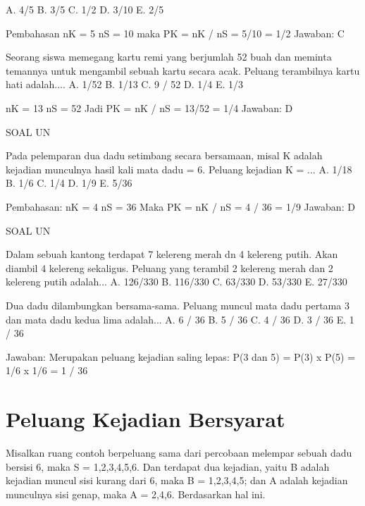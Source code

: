 \documentclass[11pt,fleqn]{book} %
\begin{document}
{{A. 4/5
B. 3/5
C. 1/2
D. 3/10
E. 2/5

\vspace{0.5in}


Pembahasan
nK = 5
nS = 10
maka PK = nK / nS = 5/10 = 1/2
Jawaban: C

\vspace{0.5in}

Seorang siswa memegang kartu remi yang berjumlah 52 buah dan meminta temannya untuk mengambil sebuah kartu secara acak. Peluang terambilnya kartu hati adalah....
A. 1/52
B. 1/13
C. 9 / 52
D. 1/4
E. 1/3

\vspace{0.5in}

nK = 13
nS = 52
Jadi PK = nK / nS = 13/52 = 1/4
Jawaban: D

\vspace{0.5in}
SOAL UN 

Pada pelemparan dua dadu setimbang secara bersamaan, misal K adalah kejadian munculnya hasil kali mata dadu = 6. Peluang kejadian K = ...
A. 1/18
B. 1/6
C. 1/4
D. 1/9
E. 5/36

\vspace{0.5in}

Pembahasan: 
nK = 4
nS = 36
Maka PK = nK / nS = 4 / 36 = 1/9
Jawaban: D

\vspace{0.5in}
SOAL UN

Dalam sebuah kantong terdapat 7 kelereng merah dn 4 kelereng putih. Akan diambil 4 kelereng sekaligus. Peluang yang terambil 2 kelereng merah dan 2 kelereng putih adalah...
A. 126/330
B. 116/330
C. 63/330
D. 53/330
E. 27/330
\vspace{0.5in}


Dua dadu dilambungkan bersama-sama. Peluang muncul mata dadu pertama 3 dan mata dadu kedua lima adalah...
A. 6 / 36
B. 5 / 36
C. 4 / 36
D. 3 / 36
E. 1 / 36

\vspace{0.5in}

Jawaban:
Merupakan peluang kejadian saling lepas:
P(3 dan 5) = P(3) x P(5) = 1/6 x 1/6 = 1 / 36


\section{Peluang Kejadian Bersyarat}	
Misalkan ruang contoh berpeluang sama dari percobaan melempar sebuah dadu bersisi 6, maka S = {1,2,3,4,5,6}. Dan terdapat dua kejadian, yaitu B adalah kejadian muncul sisi kurang dari 6, maka B = {1,2,3,4,5}; dan A adalah kejadian munculnya sisi genap, maka A = {2,4,6}. Berdasarkan hal ini.

}}
\end{document}
